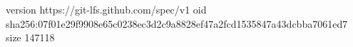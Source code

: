 version https://git-lfs.github.com/spec/v1
oid sha256:07f01e29f9908e65c0238ec3d2c9a8828ef47a2fcd1535847a43dcbba7061ed7
size 147118
